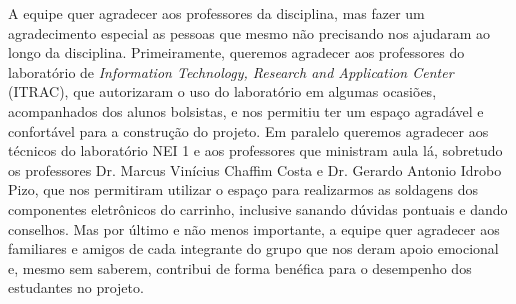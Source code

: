 \begin{agradecimentos}

A equipe quer agradecer aos professores da disciplina, mas fazer um agradecimento especial as pessoas que mesmo não precisando nos ajudaram ao longo da disciplina. Primeiramente, queremos agradecer aos professores do laboratório de \textit{Information Technology, Research and Application Center} (ITRAC), que autorizaram  o uso do laboratório em algumas ocasiões, acompanhados dos alunos bolsistas, e nos permitiu ter um espaço agradável e confortável para a construção do projeto. Em paralelo queremos agradecer aos técnicos do laboratório NEI 1 e aos professores que ministram aula lá, sobretudo os professores Dr. Marcus Vinícius Chaffim Costa e Dr. Gerardo Antonio Idrobo Pizo, que nos permitiram utilizar o espaço para realizarmos as soldagens dos componentes eletrônicos do carrinho, inclusive sanando dúvidas pontuais e dando conselhos. Mas por último e não menos importante, a equipe quer agradecer aos familiares e amigos de cada integrante do grupo que nos deram apoio emocional e, mesmo sem saberem, contribui de forma benéfica para o desempenho dos estudantes no projeto.

\end{agradecimentos}
